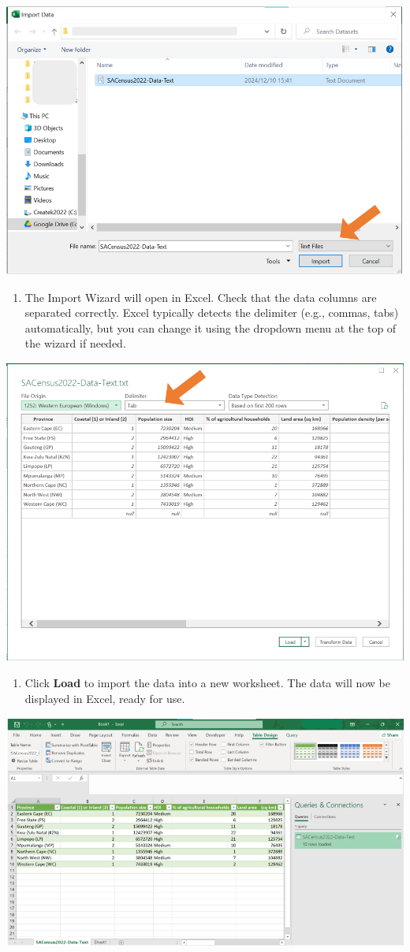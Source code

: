 \documentclass[
]{book}
\providecommand{\tightlist}{%
  \setlength{\itemsep}{0pt}\setlength{\parskip}{0pt}}
\begin{document}
\begin{center}\includegraphics[width=0.6\linewidth]{Figures/import_2} \end{center}

\begin{enumerate}
\def\labelenumi{\arabic{enumi}.}
\setcounter{enumi}{2}
\tightlist
\item
  The Import Wizard will open in Excel. Check that the data columns are separated correctly. Excel typically detects the delimiter (e.g., commas, tabs) automatically, but you can change it using the dropdown menu at the top of the wizard if needed.
\end{enumerate}

\begin{center}\includegraphics[width=0.7\linewidth]{Figures/import_3} \end{center}

\newpage

\begin{enumerate}
\def\labelenumi{\arabic{enumi}.}
\setcounter{enumi}{3}
\tightlist
\item
  Click \textbf{Load} to import the data into a new worksheet. The data will now be displayed in Excel, ready for use.
\end{enumerate}

\begin{center}\includegraphics[width=0.7\linewidth]{Figures/import_4} \end{center}
\end{document}
